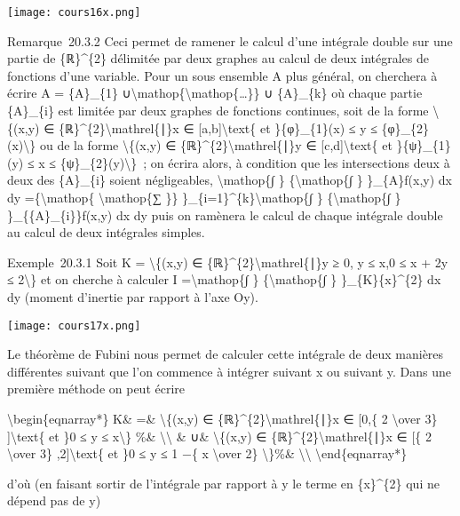\documentclass[]{article}
\begin{document}
\texttt{[image: cours16x.png]}

Remarque~20.3.2 Ceci permet de ramener le calcul d'une intégrale double
sur une partie de \{ℝ\}\^{}\{2\} délimitée par deux graphes au calcul de
deux intégrales de fonctions d'une variable. Pour un sous ensemble A
plus général, on cherchera à écrire A = \{A\}\_\{1\}
∪\textbackslash{}mathop\{\textbackslash{}mathop\{\ldots{}\}\} ∪
\{A\}\_\{k\} où chaque partie \{A\}\_\{i\} est limitée par deux graphes
de fonctions continues, soit de la forme \textbackslash{}\{(x,y) ∈
\{ℝ\}\^{}\{2\}\textbackslash{}mathrel\{∣\}x ∈
{[}a,b{]}\textbackslash{}text\{ et \}\{φ\}\_\{1\}(x) ≤ y ≤
\{φ\}\_\{2\}(x)\textbackslash{}\} ou de la forme \textbackslash{}\{(x,y)
∈ \{ℝ\}\^{}\{2\}\textbackslash{}mathrel\{∣\}y ∈
{[}c,d{]}\textbackslash{}text\{ et \}\{ψ\}\_\{1\}(y) ≤ x ≤
\{ψ\}\_\{2\}(y)\textbackslash{}\}~; on écrira alors, à condition que les
intersections deux à deux des \{A\}\_\{i\} soient négligeables,
\textbackslash{}mathop\{∫ \} \{\textbackslash{}mathop\{∫ \}
\}\_\{A\}f(x,y) dx dy =\{\textbackslash{}mathop\{
\textbackslash{}mathop\{∑ \}\}
\}\_\{i=1\}\^{}\{k\}\textbackslash{}mathop\{∫ \}
\{\textbackslash{}mathop\{∫ \} \}\_\{\{A\}\_\{i\}\}f(x,y) dx dy puis on
ramènera le calcul de chaque intégrale double au calcul de deux
intégrales simples.

Exemple~20.3.1 Soit K = \textbackslash{}\{(x,y) ∈
\{ℝ\}\^{}\{2\}\textbackslash{}mathrel\{∣\}y ≥ 0, y ≤ x,0 ≤ x + 2y ≤
2\textbackslash{}\} et on cherche à calculer I
=\textbackslash{}mathop\{∫ \} \{\textbackslash{}mathop\{∫ \}
\}\_\{K\}\{x\}\^{}\{2\} dx dy (moment d'inertie par rapport à l'axe Oy).

\texttt{[image: cours17x.png]}

Le théorème de Fubini nous permet de calculer cette intégrale de deux
manières différentes suivant que l'on commence à intégrer suivant x ou
suivant y. Dans une première méthode on peut écrire

\textbackslash{}begin\{eqnarray*\} K\& =\& \textbackslash{}\{(x,y) ∈
\{ℝ\}\^{}\{2\}\textbackslash{}mathrel\{∣\}x ∈ {[}0,\{ 2
\textbackslash{}over 3\} {]}\textbackslash{}text\{ et \}0 ≤ y ≤
x\textbackslash{}\} \%\& \textbackslash{}\textbackslash{} \& ∪\&
\textbackslash{}\{(x,y) ∈ \{ℝ\}\^{}\{2\}\textbackslash{}mathrel\{∣\}x ∈
{[}\{ 2 \textbackslash{}over 3\} ,2{]}\textbackslash{}text\{ et \}0 ≤ y
≤ 1 −\{ x \textbackslash{}over 2\} \textbackslash{}\}\%\&
\textbackslash{}\textbackslash{} \textbackslash{}end\{eqnarray*\}

d'où (en faisant sortir de l'intégrale par rapport à y le terme en
\{x\}\^{}\{2\} qui ne dépend pas de y)
\end{document}
